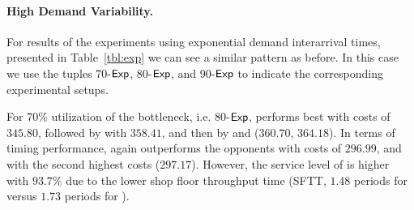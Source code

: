 \documentclass[envcountsame]{llncs}
\begin{document}
\begin{comment}
- Friedman chi-squared statistic: 97.628571
- p-value: 7.835701e-19
- rejection of the omnibus null hypothesis

* 90-Exp

      \ql{0.99} \rl{0.99} \rl{1.00} \BILOne{} \BILTwo{} \BILThree{} \BILFour{}
P_1   1252433	1173395	1024728	2399890	1655026	1159432	1012319
P_2   1074569	870660	941377	2341852	1466107	1214910	971734
P_3   1188157	965337	871242	2510900	1409012	1050054	1260441
P_4   911949	1044494	758677	2345507	1566310	1118957	1130965
P_5   1033474	897575	836501	2197182	1219749	998558	946565
P_6   1216651	1228266	933766	2692086	1685058	1391199	1272896
P_7   1015338	983438	1040244	2399295	1429570	958909	951637
P_8   1512067	878268	1430194	2565419	1444940	1067515	906021
P_9   1108092	1232311	1309534	2641681	1850877	1153341	1079572
P_10   1344449	1264977	968913	2375393	1761920	1118482	1042407
P_11   1188536	1274797	1168751	3040365	1669772	1673853	1853585
P_12   1271137	985585	915254	2327385	1599041	1175113	1205382
P_13   1337521	1080134	1114726	2410549	1531861	1078113	1003334
P_14   1347283	1098738	861594	2728058	1566173	1387567	916554
P_15   1060109	1000957	947592	2422075	1704239	1016923	1070665
P_16   1095527	922726	957775	2363731	1637310	1232300	1017197
P_17   1157196	1095892	1011316	2669102	1959411	1245607	1212991
P_18   1171769	1047445	804936	2506905	1765175	1140291	1122519
P_19   1162809	1312587	949697	2481932	1361007	1166369	1052711
P_20   1140217	1083654	879642	2504899	1529858	1170016	1056301

- Friedman chi-squared statistic: 85.800000
- p-value: 2.253674e-16
- rejection of the omnibus null hypothesis


\end{comment}


\paragraph{High Demand Variability.} For results of the experiments using exponential demand
interarrival times, presented in Table~\ref{tbl:exp} we can see a similar pattern as before. In this
case we use the tuples 70-\(\mathsf{Exp}\), 80-\(\mathsf{Exp}\), and 90-\(\mathsf{Exp}\) to indicate the corresponding
experimental setups.

For \(70\%\) utilization of the bottleneck, i.e. 80-\(\mathsf{Exp}\), \BILThree{} performs best with costs
of \(345.80\), followed by  with \(358.41\), and then by  and \BILTwo{}
(\(360.70\), \(364.18\)). In terms of timing performance, again \ARA{} outperforms the opponents
with \fgibocName{} costs of \(296.99\), and \BILThree{} with the second highest costs (\(297.17\)).
However, the service level of \BILThree{} is higher with \(93.7\%\) due to the lower shop floor
throughput time (SFTT, \(1.48\) periods for \BILThree{} versus \(1.73\) periods for ).
\end{document}
